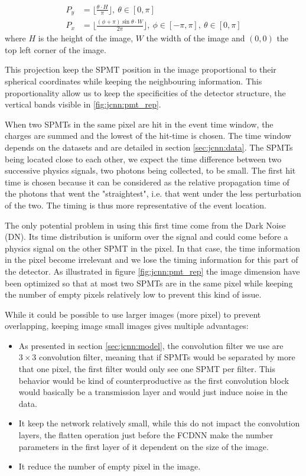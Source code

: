 \documentclass[../main.tex]{subfiles}
\begin{document}
\begin{align}
  P_y &= \bigg\lfloor \frac{\theta \cdot H}{\pi} \bigg\rfloor, ~ \theta \in [0, \pi] \\
  P_x &= \bigg\lfloor \frac{(\phi + \pi) \sin{\theta} \cdot W}{2\pi}\bigg\rfloor, ~ \phi \in [-\pi, \pi], ~ \theta \in [0, \pi]
\end{align}
where $H$ is the height of the image, $W$ the width of the image and $(0,0)$ the top left corner of the image.

This projection keep the SPMT position in the image proportional to their spherical coordinates while keeping the neighbouring information. This proportionality allow us to keep the specificities of the detector structure, the vertical bands visible in \ref{fig:jcnn:pmt_rep}.

When two SPMTs in the same pixel are hit in the event time window, the charges are summed and the lowest of the hit-time is chosen. The time window depends on the datasets and are detailed in section \ref{sec:jcnn:data}. The SPMTs being located close to each other, we expect the time difference between two successive physics signals, two photons being collected, to be small. The first hit time is chosen because it can be considered as the relative propagation time of the photons that went the "straightest", i.e. that went under the less perturbation of the two. The timing is thus more representative of the event location.

The only potential problem in using this first time come from the Dark Noise (DN). Its time distribution is uniform over the signal and could come before a physics signal on the other SPMT in the pixel. In that case, the time information in the pixel become irrelevant and we lose the timing information for this part of the detector.
As illustrated in figure \ref{fig:jcnn:pmt_rep} the image dimension have been optimized so that at most two SPMTs are in the same pixel while keeping the number of empty pixels relatively low to prevent this kind of issue.

While it could be possible to use larger images (more pixel) to prevent overlapping, keeping image small images gives multiple advantages:
\begin{itemize}
  \item As presented in section \ref{sec:jcnn:model}, the convolution filter we use are $3 \times 3$ convolution filter, meaning that if SPMTs would be separated by more that one pixel, the first filter would only see one SPMT per filter. This behavior would be kind of counterproductive as the first convolution block would basically be a transmission layer and would just induce noise in the data.
  \item It keep the network relatively small, while this do not impact the convolution layers, the flatten operation just before the FCDNN make the number parameters in the first layer of it dependent on the size of the image.
  \item It reduce the number of empty pixel in the image.
\end{itemize}
\end{document}

